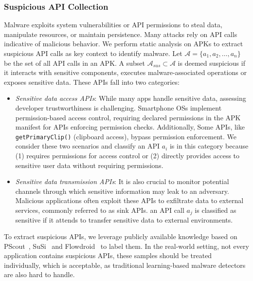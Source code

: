 \subsubsection{Suspicious API Collection}
Malware exploits system vulnerabilities or API permissions to steal data, manipulate resources, or maintain persistence. Many attacks rely on API calls indicative of malicious behavior. We perform static analysis on APKs to extract suspicious API calls as key context to identify malware. Let $\mathcal{A} = \{a_1, a_2, \ldots, a_n\}$ be the set of all API calls in an APK. A subset $\mathcal{A}_{sus} \subset \mathcal{A}$ is deemed suspicious if it interacts with sensitive components, executes malware-associated operations or exposes sensitive data. These APIs fall into two categories:
\begin{itemize}
    \item \textit{Sensitive data access APIs}: While many apps handle sensitive data, assessing developer trustworthiness is challenging. Smartphone OSs implement permission-based access control, requiring declared permissions in the APK manifest for APIs enforcing permission checks. Additionally, Some APIs, like \verb|getPrimaryClip()| (clipboard access), bypass permission enforcement. We consider these two scenarios and classify an API $a_i$ is in this category because (1) requires permissions for access control or (2) directly provides access to sensitive user data without requiring permissions.
    \item \textit{Sensitive data transmission APIs}: It is also crucial to monitor potential channels through which sensitive information may leak to an adversary. Malicious applications often exploit these APIs to exfiltrate data to external services, commonly referred to as sink APIs. an API call $a_j$ is classified as sensitive if it attends to transfer sensitive data to external environments.
\end{itemize}

To extract suspicious APIs, we leverage publicly available knowledge based on PScout~\cite{pscout}, SuSi~\cite{susi} and Flowdroid~\cite{flowdroid} to label them. In the real-world setting, not every application contains suspicious APIs, these samples should be treated individually, which is acceptable, as traditional learning-based malware detectors are also hard to handle.



